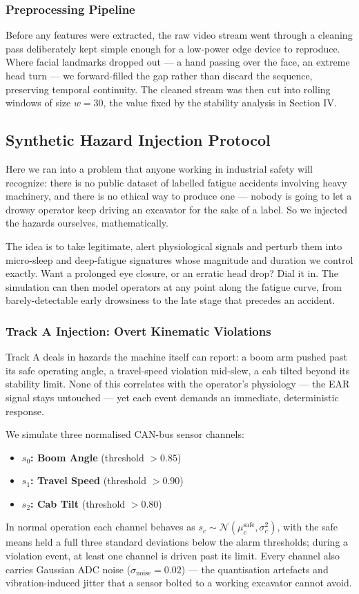 \subsubsection{Preprocessing Pipeline}
Before any features were extracted, the raw video stream went through a
cleaning pass deliberately kept simple enough for a low-power edge device to
reproduce. Where facial landmarks dropped out --- a hand passing over the face,
an extreme head turn --- we forward-filled the gap rather than discard the
sequence, preserving temporal continuity. The cleaned stream was then cut into
rolling windows of size $w = 30$, the value fixed by the stability analysis in
Section IV.

\subsection{Synthetic Hazard Injection Protocol}
Here we ran into a problem that anyone working in industrial safety will
recognize: there is no public dataset of labelled fatigue accidents involving
heavy machinery, and there is no ethical way to produce one --- nobody is going
to let a drowsy operator keep driving an excavator for the sake of a label. So
we injected the hazards ourselves, mathematically.

The idea is to take legitimate, alert physiological signals and perturb them
into micro-sleep and deep-fatigue signatures whose magnitude and duration we
control exactly. Want a prolonged eye closure, or an erratic head drop? Dial it
in. The simulation can then model operators at any point along the fatigue
curve, from barely-detectable early drowsiness to the late stage that precedes
an accident.

\subsubsection{Track A Injection: Overt Kinematic Violations}
Track A deals in hazards the machine itself can report: a boom arm pushed past
its safe operating angle, a travel-speed violation mid-slew, a cab tilted
beyond its stability limit. None of this correlates with the operator's
physiology --- the EAR signal stays untouched --- yet each event demands an
immediate, deterministic response.

We simulate three normalised CAN-bus sensor channels:
\begin{itemize}
    \item \textbf{$s_0$: Boom Angle} (threshold $> 0.85$)
    \item \textbf{$s_1$: Travel Speed} (threshold $> 0.90$)
    \item \textbf{$s_2$: Cab Tilt} (threshold $> 0.80$)
\end{itemize}
In normal operation each channel behaves as $s_c \sim
\mathcal{N}(\mu_c^{\text{safe}}, \sigma_c^2)$, with the safe means held a full
three standard deviations below the alarm thresholds; during a violation
event, at least one channel is driven past its limit. Every channel also
carries Gaussian ADC noise ($\sigma_{\text{noise}} = 0.02$) --- the
quantisation artefacts and vibration-induced jitter that a sensor bolted to a
working excavator cannot avoid.

